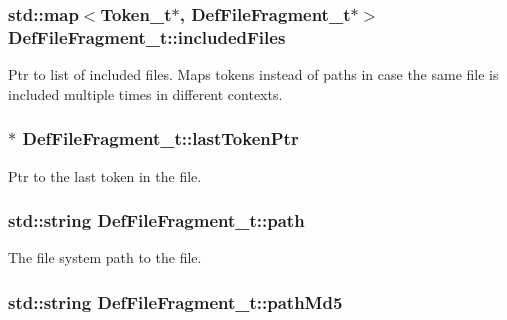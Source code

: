 \subsubsection[{\texorpdfstring{included\+Files}{includedFiles}}]{\setlength{\rightskip}{0pt plus 5cm}std\+::map$<${\bf Token\+\_\+t}$\ast$, {\bf Def\+File\+Fragment\+\_\+t}$\ast$$>$ Def\+File\+Fragment\+\_\+t\+::included\+Files}\hypertarget{struct_def_file_fragment__t_a328166cab44b6183d1471356374f6171}{}\label{struct_def_file_fragment__t_a328166cab44b6183d1471356374f6171}
Ptr to list of included files. Maps tokens instead of paths in case the same file is included multiple times in different contexts. 
\subsubsection[{\texorpdfstring{last\+Token\+Ptr}{lastTokenPtr}}]{$\ast$ Def\+File\+Fragment\+\_\+t\+::last\+Token\+Ptr}\hypertarget{struct_def_file_fragment__t_a9f671dbcc9017db39f9b5549713ed86a}{}\label{struct_def_file_fragment__t_a9f671dbcc9017db39f9b5549713ed86a}


Ptr to the last token in the file. 

\subsubsection[{\texorpdfstring{path}{path}}]{\setlength{\rightskip}{0pt plus 5cm}std\+::string Def\+File\+Fragment\+\_\+t\+::path}\hypertarget{struct_def_file_fragment__t_a74e1e418da78f9240c2cbc97a6d6d86d}{}\label{struct_def_file_fragment__t_a74e1e418da78f9240c2cbc97a6d6d86d}


The file system path to the file. 

\subsubsection[{\texorpdfstring{path\+Md5}{pathMd5}}]{\setlength{\rightskip}{0pt plus 5cm}std\+::string Def\+File\+Fragment\+\_\+t\+::path\+Md5}\hypertarget{struct_def_file_fragment__t_a1d4a46b98adb0d51baa6d7ba3236f232}{}\label{struct_def_file_fragment__t_a1d4a46b98adb0d51baa6d7ba3236f232}


